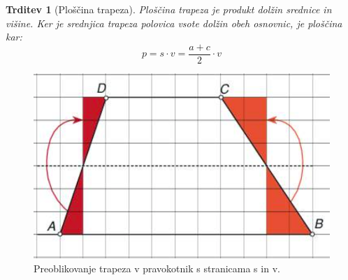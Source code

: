 \documentclass{article}
\newtheorem{trditev}{Trditev}[subsection]
\begin{document}
\begin{trditev}[Ploščina trapeza]
    Ploščina trapeza je produkt dolžin srednice in višine. Ker je srednjica trapeza polovica vsote dolžin obeh osnovnic, je ploščina kar:
    \[ p = s \cdot v =  \frac{a + c}{2} \cdot v \]
\end{trditev}

\begin{figure}[h]
    \includegraphics[width=\linewidth]{preoblikovanjeTrapezaVPravokotnik.png}
    \centering
    \caption{Preoblikovanje trapeza v pravokotnik s stranicama s in v.}
\end{figure}
\end{document}
